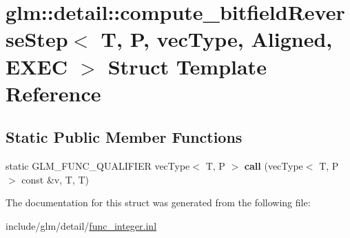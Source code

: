 \hypertarget{structglm_1_1detail_1_1compute__bitfieldReverseStep}{}\section{glm\+:\+:detail\+:\+:compute\+\_\+bitfield\+Reverse\+Step$<$ T, P, vec\+Type, Aligned, E\+X\+EC $>$ Struct Template Reference}
\label{structglm_1_1detail_1_1compute__bitfieldReverseStep}
\subsection*{Static Public Member Functions}
\begin{DoxyCompactItemize}
\item 
\mbox{\label{structglm_1_1detail_1_1compute__bitfieldReverseStep_a4dbbf3d91b30ab5a0f2cbfa59ab27787}} 
static G\+L\+M\+\_\+\+F\+U\+N\+C\+\_\+\+Q\+U\+A\+L\+I\+F\+I\+ER vec\+Type$<$ T, P $>$ {\bfseries call} (vec\+Type$<$ T, P $>$ const \&v, T, T)
\end{DoxyCompactItemize}


The documentation for this struct was generated from the following file\+:\begin{DoxyCompactItemize}
\item 
include/glm/detail/\hyperlink{func__integer_8inl}{func\+\_\+integer.\+inl}\end{DoxyCompactItemize}
